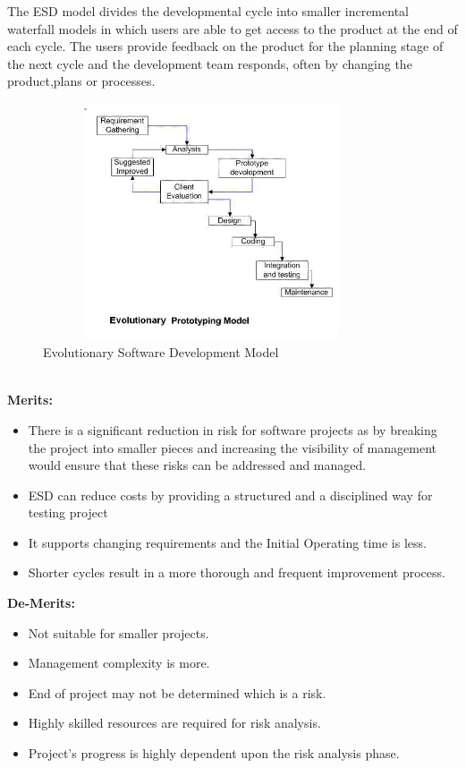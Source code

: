 \documentclass{article}
\begin{document}
The ESD model divides the developmental cycle into smaller incremental waterfall models in which users are able to get access to the product at the end of each cycle. The users provide feedback on the product for the planning stage of the next cycle and the development team responds, often by changing the product,plans or processes.
 \begin{figure}
  \includegraphics[width=10cm, height=7cm]{fig7.png}
  \caption{Evolutionary Software Development Model}
  
\end{figure}
\vspace{6cm}
\\\textbf{Merits:}
\begin{itemize}
\item	There is a significant reduction in risk for software projects as by breaking the project into smaller pieces and increasing the visibility of management would ensure that these risks can be addressed and managed. 
\item	ESD can reduce costs by providing a structured and a disciplined way for testing project
\item	It supports changing requirements and the Initial Operating time is less.
\item	Shorter cycles result in a more thorough and frequent improvement process. 
\end{itemize}
\textbf{De-Merits:}
\begin{itemize}
\item	Not suitable for smaller projects.
\item	Management complexity is more.
\item	End of project may not be determined which is a risk.
\item	Highly skilled resources are required for risk analysis.
\item	Project's progress is highly dependent upon the risk analysis phase.
\end{itemize}
\end{document}
